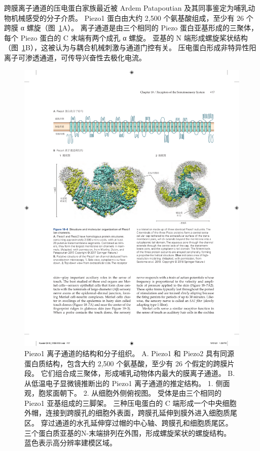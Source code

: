 跨膜离子通道的压电蛋白家族最近被 Ardem Patapoutian 及其同事鉴定为哺乳动物机械感受的分子介质。
Piezo1 蛋白由大约 2,500 个氨基酸组成，至少有 26 个跨膜 α 螺旋（图~\ref{fig:18_6}A）。
离子通道是由三个相同的 Piezo 蛋白亚基形成的三聚体，每个 Piezo 蛋白的 C 末端有两个成孔 α 螺旋。
亚基的 N 端形成螺旋桨状结构（图~\ref{fig:18_6}B），这被认为与耦合机械刺激与通道门控有关。
压电蛋白形成非特异性阳离子可渗透通道，可传导兴奋性去极化电流。


\begin{figure}[htbp]
	\centering
	\includegraphics[width=1.0\linewidth]{chap18/fig_18_6}
	\caption{Piezo1 离子通道的结构和分子组织。
		A. Piezo1 和 Piezo2 具有同源蛋白质结构，包含大约 2,500 个氨基酸，至少有 26 个假定的跨膜片段。
		它们组合成三聚体，形成哺乳动物体内最大的膜离子通道\cite{murthy2017piezos}。
		B. 从低温电子显微镜推断出的 Piezo1 离子通道的推定结构。
		1. 侧面观，胞浆面朝下。
		2. 从细胞外侧俯视图。
		受体是由三个相同的 Piezo1 亚基组成的三脚架。
		三种压电蛋白的 C 端形成一个中央细胞外帽，连接到跨膜孔的细胞外表面，跨膜孔延伸到膜外进入细胞质尾区。
		穿过通道的水孔延伸穿过帽的中心轴、跨膜孔和细胞质尾区。
		三个蛋白质亚基的N-末端排列在外围，形成螺旋桨状的螺旋结构。 
		蓝色表示高分辨率建模区域\cite{saotome2018structure}。}
	\label{fig:18_6}
\end{figure}



